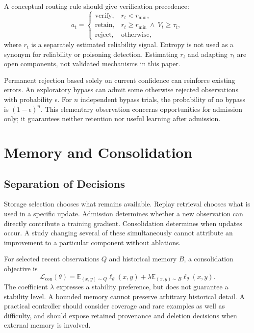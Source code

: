 \documentclass[conference]{IEEEtran}
\newcommand{\E}{\mathbb{E}}
\begin{document}
A conceptual routing rule should give verification precedence:
\begin{equation}
a_t=\begin{cases}
\mathrm{verify},&r_t<r_{\min},\\
\mathrm{retain},&r_t\ge r_{\min}\ \land\ V_t\ge\tau_t,\\
\mathrm{reject},&\text{otherwise},
\end{cases}
\end{equation}
where $r_t$ is a separately estimated reliability signal. Entropy is not used as a synonym for reliability or poisoning detection. Estimating $r_t$ and adapting $\tau_t$ are open components, not validated mechanisms in this paper.

Permanent rejection based solely on current confidence can reinforce existing errors. An exploratory bypass can admit some otherwise rejected observations with probability $\epsilon$. For $n$ independent bypass trials, the probability of no bypass is $(1-\epsilon)^n$. This elementary observation concerns opportunities for admission only; it guarantees neither retention nor useful learning after admission.

\section{Memory and Consolidation}
\subsection{Separation of Decisions}
Storage selection chooses what remains available. Replay retrieval chooses what is used in a specific update. Admission determines whether a new observation can directly contribute a training gradient. Consolidation determines when updates occur. A study changing several of these simultaneously cannot attribute an improvement to a particular component without ablations.

For selected recent observations $Q$ and historical memory $B$, a consolidation objective is
\begin{equation}
 \mathcal L_{\mathrm{con}}(\theta)=\E_{(x,y)\sim Q}\ell_\theta(x,y)
 +\lambda\E_{(x,y)\sim B}\ell_\theta(x,y).
\end{equation}
The coefficient $\lambda$ expresses a stability preference, but does not guarantee a stability level. A bounded memory cannot preserve arbitrary historical detail. A practical controller should consider coverage and rare examples as well as difficulty, and should expose retained provenance and deletion decisions when external memory is involved.
\end{document}

